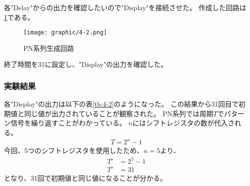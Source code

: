 \documentclass[dvipdfmx]{jsarticle}
\begin{document}
各"Delay"からの出力を確認したいので"Display"を接続させた。
作成した回路は\ref*{fig:4-2}である。

\begin{figure}[H]
  \begin{center}
    \texttt{[image: graphic/4-2.png]}
  \end{center}
  \caption{PN系列生成回路}
  \label{fig:4-2}
\end{figure}

終了時間を31に設定し、"Display"の出力を確認した。

\subsubsection{実験結果}
各"Display"の出力は以下の表\ref*{tb:4-2}のようになった。
この結果から31回目で初期値と同じ値が出力されていることが観察された。
PN系列では周期$T$でパターン信号を繰り返すことがわかっている。
$n$にはシフトレジスタの数が代入される。
\begin{align}
  T = 2^n - 1
\end{align}
今回、5つのシフトレジスタを使用したため、$n = 5$より、
\begin{align}
  T' &= 2^5 - 1\\
  T' &= 31
\end{align}
となり、31回で初期値と同じ値になることが分かる。
\end{document}
